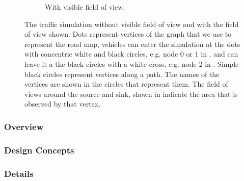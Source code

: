 \begin{figure}
\begin{subfigure}{0.49\textwidth}
		\caption{With visible field of view.}
		\label{fig:model:simulation:fix}
	\end{subfigure}	
	\caption{The traffic simulation without  visible field of view and  with the field of view shown. Dots represent vertices of the graph that we use to represent the road map, vehicles can enter the simulation at the dots with concentric white and black circles, e.g. node 0 or 1 in , and can leave it a the black circles with a white cross, e.g. node 2 in . Simple black circles represent vertices along a path. The names of the vertices are shown in the circles that represent them. The field of views around the source and sink, shown in  indicate the area that is observed by that vertex.}
	\label{fig:model:simulation}
\end{figure}

\subsubsection{Overview}
\label{subsub:method:model:overview}


\subsubsection{Design Concepts}
\label{subsub:method:model:design}


\subsubsection{Details}
\label{subsub:method:model:details}
